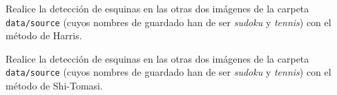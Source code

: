 \vspace{5mm}
\begin{tcolorbox}[colback=gray!10, colframe=gray!30, coltitle=black, title=Pregunta A.1, halign=left]
Realice la detección de esquinas en las otras dos imágenes de la carpeta \texttt{data/source} (cuyos nombres de guardado han de ser \textit{sudoku} y \textit{tennis}) con el método de Harris.
\end{tcolorbox}

\vspace{5mm}
\begin{tcolorbox}[colback=gray!10, colframe=gray!30, coltitle=black, title=Pregunta A.2, halign=left]
Realice la detección de esquinas en las otras dos imágenes de la carpeta \texttt{data/source} (cuyos nombres de guardado han de ser \textit{sudoku} y \textit{tennis}) con el método de Shi-Tomasi.
\end{tcolorbox}